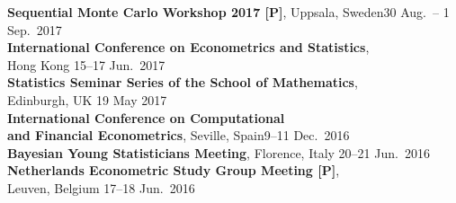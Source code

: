 \documentclass[margin,line]{resume}
\begin{document}
\begin{resume}
  
	\textbf{Sequential Monte Carlo Workshop 2017 [P]}, Uppsala, Sweden\hfill 30 Aug.\ -- 1 Sep.\ 2017 \vspace{1mm} \\ 
	\textbf{ International Conference on Econometrics and Statistics},\\ Hong Kong \hfill 15--17 Jun.\ 2017 \vspace{1mm} \\ 
    \textbf{Statistics Seminar Series of the School of Mathematics},\\ Edinburgh, UK \hfill 19 May 2017 \vspace{1mm} \\ 
    \textbf{ International Conference on Computational \\ and Financial Econometrics},  Seville, Spain\hfill 9--11 Dec.\ 2016  \vspace{1mm} \\ 
	\textbf{ Bayesian Young Statisticians Meeting}, Florence, Italy \hfill 20--21 Jun.\ 2016  \vspace{1mm} \\ 
	\textbf{ Netherlands Econometric Study Group Meeting [P]},\\
    Leuven, Belgium \hfill 17--18 Jun.\ 2016  \vspace{1mm} \\ 
  
\vspace{-5mm}


\end{resume}
\end{document}
